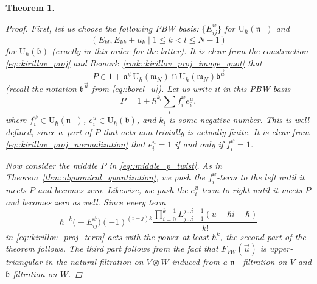 \documentclass[11pt]{article}
\numberwithin{equation}{section}
\newtheorem{Theorem}{Theorem}[section]
\newcommand{\U}{\mathrm{U}_{\hbar}}
\renewcommand{\b}{\mathfrak{b}}
\newcommand{\n}{\mathfrak{n}}
\newcommand{\m}{\mathfrak{m}}
\begin{document}
\begin{Theorem}
\begin{proof}
			First, let us choose the following PBW basis: $\bigl\{E_{ij}^{\psi}\bigr\}$ for $\U(\n_-)$ and
			\[
			(E_{kl}, E_{kk} + u_k \mid 1 \leq k < l \leq N-1)
			\]
			for $\U(\b)$ (exactly in this order for the latter). It is clear from the construction \eqref{eq::kirillov_proj} and Remark~\ref{rmk::kirillov_proj_image_quot} that
			\begin{equation}
				\label{eq::kirillov_proj_normalization}
				P \in 1 + \n_-^{\psi} \U(\m_N) \cap \U(\m_N) \b^{\vec{u}}
			\end{equation}
			(recall the notation $\b^{\vec{u}}$ from \eqref{eq::borel_u}). Let us write it in this PBW basis
			\begin{equation*}
				P = 1 + \hbar^{k_i}\sum\limits_i f^{\psi}_i e_i^u,
			\end{equation*}
			where $f^{\psi}_i \in \U(\n_-)$, $e_i^u \in \U(\b)$, and $k_i$ is some negative number. This is well defined, since a~part of $P$ that acts non-trivially is actually finite. It is clear from \eqref{eq::kirillov_proj_normalization} that $e^u_i=1$ if and only if $f^{\psi}_i=1$.
			
			Now consider the middle $P$ in \eqref{eq::middle_p_twist}. As in Theorem~\ref{thm::dynamical_quantization}, we push the $f_i^{\psi}$-term to the left until it meets $P$ and becomes zero. Likewise, we push the $e_i^u$-term to right until it meets $P$ and becomes zero as well. Since every term
			\[
			\hbar^{-k} \bigl(-E_{ij}^{\psi}\bigr) (-1)^{(i+j)k} \frac{\prod_{i=0}^{k-1} L_{j \dots i-1}^{j \dots i-1}(u-\hbar i + \hbar)}{k!}
			\]
			in \eqref{eq::kirillov_proj_term} acts with the power at least $\hbar^k$, the second part of the theorem follows. The third part follows from the fact that $F_{VW}(\vec{u})$ is upper-triangular in the natural filtration on $V\otimes W$ induced from a $\n_-$-filtration on $V$ and $\b$-filtration on $W$.
		\end{proof}
	\end{Theorem}
	
\end{document}

